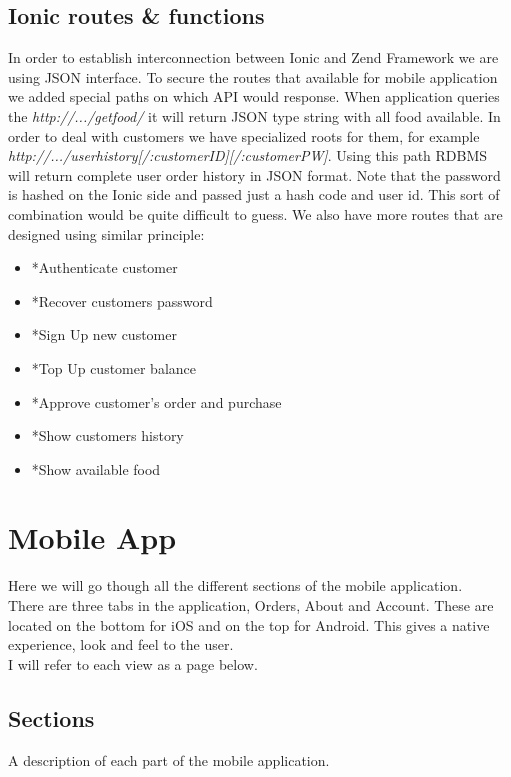 	\subsection{Ionic routes \& functions}
		In order to establish interconnection between Ionic and Zend Framework we are using JSON interface. To secure the routes that available for mobile application we added special paths on which API would response. When application queries the \textit{http://.../getfood/} it will return JSON type string with all food available. In order to deal with customers we have specialized roots for them, for example \textit{http://.../userhistory[/:customerID][/:customerPW]}. Using this path RDBMS will return complete user order history in JSON format. Note that the password is hashed on the Ionic side and passed just a hash code and user id. This sort of combination would be quite difficult to guess. We also have more routes that are designed using similar principle:
		\begin{itemize}
			\item *Authenticate customer
			\item *Recover customers password
			\item *Sign Up new customer
			\item *Top Up customer balance
			\item *Approve customer's order and purchase
			\item *Show customers history
			\item *Show available food
		\end{itemize}
	



\pagebreak
  \section{Mobile App}
Here we will go though all the different sections of the mobile application.
\\

There are three tabs in the application, Orders, About and Account.
These are located on the bottom for iOS and on the top for Android.
This gives a native experience, look and feel to the user.
\\

I will refer to each view as a page below.

\subsection{Sections}
A description of each part of the mobile application.
\\

